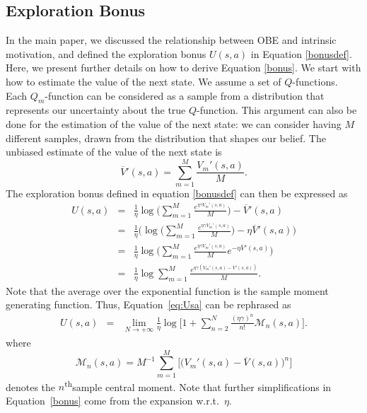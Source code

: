 \subsection{Exploration Bonus}
In the main paper, we discussed the relationship between OBE and intrinsic motivation, and defined the exploration bonus $U(s,a)$ in Equation \eqref{bonusdef}. Here, we present further details on how to derive Equation \eqref{bonus}. We start with how to estimate the value of the next state.
We assume a set of $Q$-functions. Each $Q_m$-function can be considered as a sample from a distribution that represents our uncertainty about the true $Q$-function. This argument can also be done for the estimation of the value of the next state: we can consider having $M$ different samples, drawn from the distribution that shapes our belief.
The unbiased estimate of the value of the next state is
\begin{equation}
  	\overline{V}'(s,a) = \sum_{m=1}^M \frac{V_m'(s,a)}{M}.
\end{equation}
The exploration bonus defined in equation \eqref{bonusdef} can then be expressed as
\begin{eqnarray}
U(s,a) & =& \frac{1}{\eta}\log\bigg(\sum_{m=1}^M \frac{e^{\eta\gamma V_m'(s,a) }}{M} \bigg) - \overline{V}'(s,a)\nonumber \\
& =& \frac{1}{\eta}\Bigg(\log\bigg(\sum_{m=1}^M \frac{e^{\eta\gamma V_m'(s,a) }}{M}\bigg)  - \eta \overline{V}'(s,a)\Bigg)\nonumber \\
& =& \frac{1}{\eta}\log\bigg(\sum_{m=1}^M \frac{e^{\eta\gamma V_m'(s,a) }}{M}   e^{-\eta \overline{V}'(s,a)}\bigg)\nonumber \\
& =& \frac{1}{\eta}\log\sum_{m=1}^M \frac{e^{\eta\gamma( V_m'(s,a) -\overline{V}'(s,a))}}{M}. 
  \label{eq:Usa}
\end{eqnarray}
Note that the average over the exponential function is the sample moment generating function.
Thus, Equation~\eqref{eq:Usa} can be rephrased as
\begin{eqnarray}
U(s,a) & = & \lim_{N \to +\infty}\frac{1}{\eta} \log \Biggl[  1 + \sum_{n=2}^{N} \frac{(\eta\gamma)^n}{n!}\mathcal{M}_n(s,a)\Biggr]. \nonumber 
\end{eqnarray}
where 
\begin{equation}
\mathcal{M}_n(s,a) = M^{-1} \sum_{m=1}^M \Biggl[ \Big( V_m'(s,a) -\overline{V}(s,a) \Big)^n \Biggr]
\end{equation}
denotes the $n$\textsuperscript{th}sample central moment.
Note that further simplifications in Equation~\eqref{bonus} come from the expansion w.r.t.~$\eta$. 

